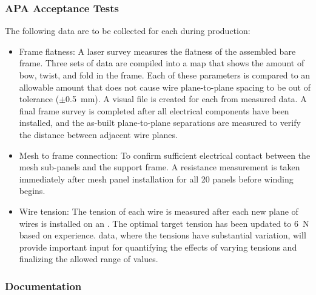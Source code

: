 \subsubsection{APA Acceptance Tests} 

The following  data are to be collected for each  during production:  

\begin{itemize}

\item Frame flatness: A laser survey measures the flatness of the assembled bare frame. Three sets of data are compiled into a map that shows the amount of bow, twist, and fold in the frame. Each of these parameters is compared to an allowable amount that does not cause wire plane-to-plane spacing to be out of tolerance ($\pm$\SI{0.5}{mm}).  A visual file is created for each  from measured data. A final frame survey is completed after all electrical components have been installed, and the as-built plane-to-plane separations are measured to verify the distance between adjacent wire planes.

\item Mesh to frame connection: To confirm sufficient electrical contact between the mesh sub-panels and the  support frame.  A resistance measurement is taken immediately after mesh panel installation for all \num{20} panels before winding begins.

\item Wire tension: The tension of each wire is measured after each new plane of wires is installed on an . The optimal target tension has been updated to \SI{6}{N} based on  experience.   data, where the tensions have substantial variation, will provide important input for quantifying the effects of varying tensions and finalizing the allowed range of values.  
\end{itemize}


\subsubsection{Documentation} 
\label{sec:fdsp-apa-prod-doc}

